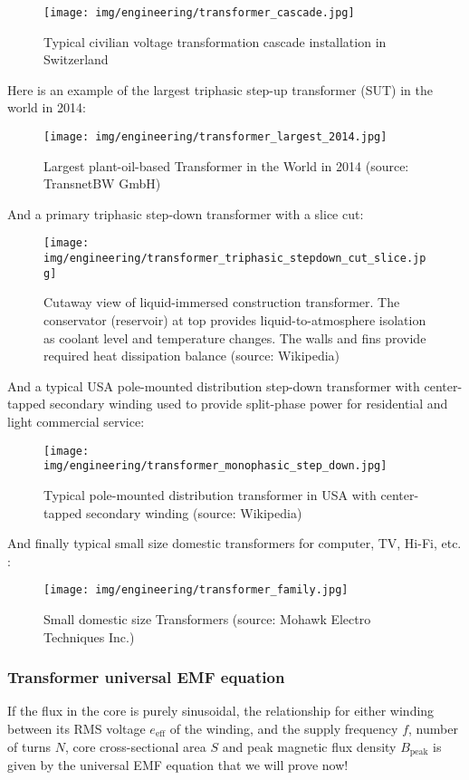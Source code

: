 	\begin{figure}[H]
		\centering
		\texttt{[image: img/engineering/transformer\_cascade.jpg]}
		\caption{Typical civilian voltage transformation cascade installation in Switzerland}
	\end{figure}
	\pagebreak
	Here is an example of the largest triphasic step-up transformer (SUT) in the world in 2014:
	\begin{figure}[H]
		\centering
		\texttt{[image: img/engineering/transformer\_largest\_2014.jpg]}
		\caption[Largest plant-oil-based Transformer in the World in 2014]{Largest plant-oil-based Transformer in the World in 2014 (source: TransnetBW GmbH)}
	\end{figure}
	And a primary triphasic step-down transformer with a slice cut:
	\begin{figure}[H]
		\centering
		\texttt{[image: img/engineering/transformer\_triphasic\_stepdown\_cut\_slice.jpg]}
		\caption[Cutaway view of liquid-immersed construction transformer]{Cutaway view of liquid-immersed construction transformer. The conservator (reservoir) at top provides liquid-to-atmosphere isolation as coolant level and temperature changes. The walls and fins provide required heat dissipation balance (source: Wikipedia)}
	\end{figure}
	And a typical USA pole-mounted distribution step-down transformer  with center-tapped secondary winding used to provide split-phase power for residential and light commercial service:
	\begin{figure}[H]
		\centering
		\texttt{[image: img/engineering/transformer\_monophasic\_step\_down.jpg]}
		\caption[Typical pole-mounted distribution transformer in USA with center-tapped secondary winding]{Typical pole-mounted distribution transformer in USA with center-tapped secondary winding (source: Wikipedia)}
	\end{figure}
	And finally typical small size domestic transformers for computer, TV, Hi-Fi, etc. :
	\begin{figure}[H]
		\centering
		\texttt{[image: img/engineering/transformer\_family.jpg]}
		\caption[Small domestic size Transformers]{Small domestic size Transformers (source: Mohawk Electro Techniques Inc.)}
	\end{figure}
	
	\subsubsection{Transformer universal EMF equation}
	If the flux in the core is purely sinusoidal, the relationship for either winding between its RMS voltage $e_\text{eff}$ of the winding, and the supply frequency $f$, number of turns $N$, core cross-sectional area $S$ and peak magnetic flux density $B_\text{peak}$ is given by the universal EMF equation that we will prove now!
	
